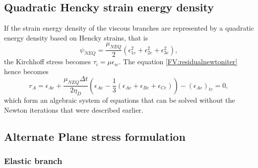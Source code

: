 \documentclass[11pt,twoside,TimesRoman]{article}
\newcommand{\parder}[2]{{\dfrac{\partial #1}{\partial #2}}}
\begin{document}
\subsection{Quadratic Hencky strain energy density}
If the strain energy density of the viscous branches are represented by a quadratic energy density based on Hencky strains, that is
\begin{equation}
	\psi_{NEQ} = \frac{\mu_{NEQ}}{2}  \left( \epsilon_{1e}^2 + \epsilon_{2e}^2+\epsilon_{3e}^2     \right),
\end{equation}
the Kirchhoff stress becomes $\tau_i = \mu \epsilon_{ie}$. The equation \ref{FV:residualnewtoniter} hence becomes
\begin{equation}
	r_A	 = \epsilon_{Ae} + \frac{\mu_{NEQ} \Delta t }{2 \eta_D} \left(\epsilon_{Ae} - \frac{1}{3} (\epsilon_{Ae}+\epsilon_{Be}+\epsilon_{Ce}) \right) - 	(\epsilon_{Ae})_{tr} = 0,
\end{equation}
which form an algebraic system of equations that can be solved without the Newton iterations that were described earlier. 

\subsection{Alternate Plane stress formulation}
\subsubsection*{Elastic branch}
\end{document}
